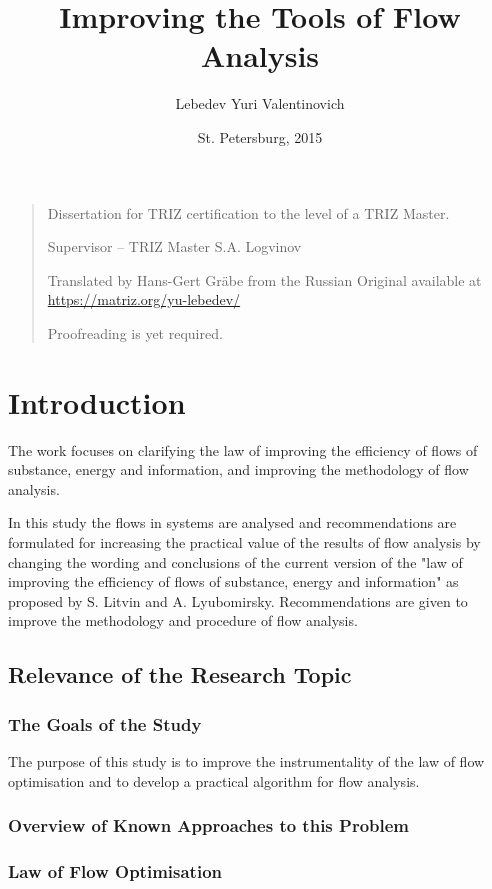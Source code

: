 \documentclass[a4paper,11pt]{article}
\author{Lebedev Yuri Valentinovich}
\title{Improving the Tools of Flow Analysis}
\date{St. Petersburg, 2015}
\begin{document}
\maketitle

\begin{quote}
  Dissertation for TRIZ certification to the level of a TRIZ Master.

  Supervisor -- TRIZ Master S.A. Logvinov

  Translated by Hans-Gert Gräbe from the Russian Original available at
  \url{https://matriz.org/yu-lebedev/}

  Proofreading is yet required.
\end{quote}
\tableofcontents

\section{Introduction}

The work focuses on clarifying the law of improving the efficiency of flows
of substance, energy and information, and improving the methodology of flow
analysis.

In this study the flows in systems are analysed and recommendations are
formulated for increasing the practical value of the results of flow analysis
by changing the wording and conclusions of the current version of the "law of
improving the efficiency of flows of substance, energy and information" as
proposed by S. Litvin and A. Lyubomirsky. Recommendations are given to improve
the methodology and procedure of flow analysis.

\subsection{Relevance of the Research Topic}

\subsubsection{The Goals of the Study}

The purpose of this study is to improve the instrumentality of the law of flow
optimisation and to develop a practical algorithm for flow analysis.

\subsubsection{Overview of Known Approaches to this Problem}

\subsubsection*{Law of Flow Optimisation} 
\end{document}

